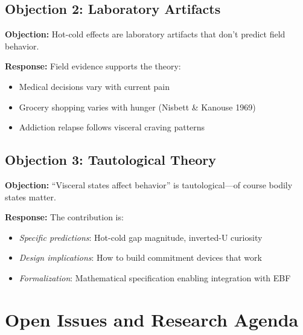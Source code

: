 \subsection{Objection 2: Laboratory Artifacts}

\textbf{Objection:} Hot-cold effects are laboratory artifacts that don't predict field behavior.

\textbf{Response:} Field evidence supports the theory:
\begin{itemize}[nosep]
\item Medical decisions vary with current pain \citep{loewenstein2006hot}
\item Grocery shopping varies with hunger (Nisbett \& Kanouse 1969)
\item Addiction relapse follows visceral craving patterns
\end{itemize}

\subsection{Objection 3: Tautological Theory}

\textbf{Objection:} ``Visceral states affect behavior'' is tautological---of course bodily states matter.

\textbf{Response:} The contribution is:
\begin{itemize}[nosep]
\item \textit{Specific predictions}: Hot-cold gap magnitude, inverted-U curiosity
\item \textit{Design implications}: How to build commitment devices that work
\item \textit{Formalization}: Mathematical specification enabling integration with EBF
\end{itemize}


\section{Open Issues and Research Agenda}
\label{sec:lo-open}

